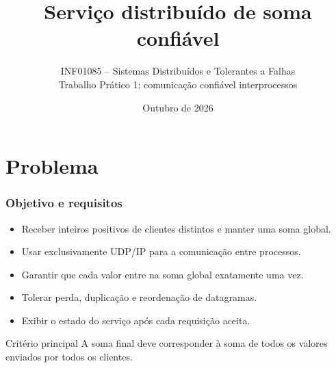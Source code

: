 \documentclass{beamer}
\title[Serviço distribuído de soma]{Serviço distribuído de soma confiável}
\subtitle{INF01085 -- Sistemas Distribuídos e Tolerantes a Falhas\\Trabalho Prático 1: comunicação confiável interprocessos}
\author{\Integrantes}
\institute{Instituto de Informática -- UFRGS}
\date{Outubro de 2026}
\begin{document}
\InfTitlePage

\section{Problema}

\begin{frame}
  \frametitle{Objetivo e requisitos}
  \begin{itemize}
    \item Receber inteiros positivos de clientes distintos e manter uma soma global.
    \item Usar exclusivamente UDP/IP para a comunicação entre processos.
    \item Garantir que cada valor entre na soma global exatamente uma vez.
    \item Tolerar perda, duplicação e reordenação de datagramas.
    \item Exibir o estado do serviço após cada requisição aceita.
  \end{itemize}

  \vspace{1em}
  \begin{block}{Critério principal}
    A soma final deve corresponder à soma de todos os valores enviados por todos os clientes.
  \end{block}
\end{frame}
\end{document}

